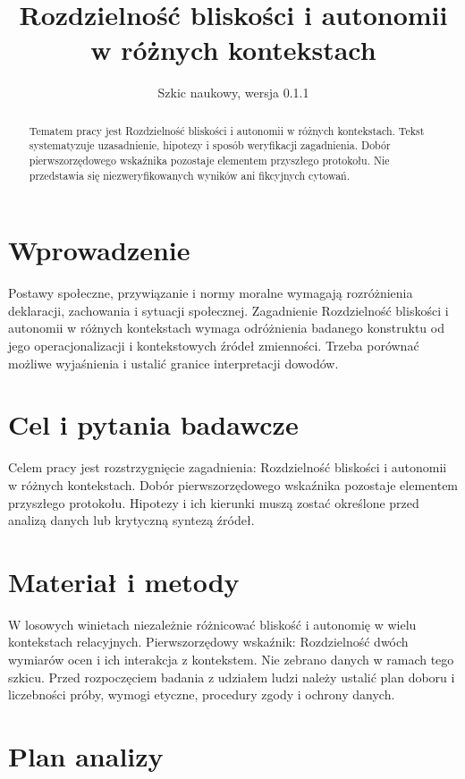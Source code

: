 \documentclass[11pt,a4paper]{article}
\title{Rozdzielność bliskości i autonomii w różnych kontekstach}
\author{}
\date{Szkic naukowy, wersja 0.1.1}
\begin{document}
\maketitle

\begin{abstract}

Tematem pracy jest Rozdzielność bliskości i autonomii w różnych kontekstach. Tekst systematyzuje uzasadnienie, hipotezy i sposób weryfikacji zagadnienia. Dobór pierwszorzędowego wskaźnika pozostaje elementem przyszłego protokołu. Nie przedstawia się niezweryfikowanych wyników ani fikcyjnych cytowań.

\end{abstract}

\section{Wprowadzenie}

Postawy społeczne, przywiązanie i normy moralne wymagają rozróżnienia deklaracji, zachowania i sytuacji społecznej. Zagadnienie Rozdzielność bliskości i autonomii w różnych kontekstach wymaga odróżnienia badanego konstruktu od jego operacjonalizacji i kontekstowych źródeł zmienności. Trzeba porównać możliwe wyjaśnienia i ustalić granice interpretacji dowodów.

\section{Cel i pytania badawcze}

Celem pracy jest rozstrzygnięcie zagadnienia: Rozdzielność bliskości i autonomii w różnych kontekstach. Dobór pierwszorzędowego wskaźnika pozostaje elementem przyszłego protokołu. Hipotezy i ich kierunki muszą zostać określone przed analizą danych lub krytyczną syntezą źródeł.

\section{Materiał i metody}

W losowych winietach niezależnie różnicować bliskość i autonomię w wielu kontekstach relacyjnych. Pierwszorzędowy wskaźnik: Rozdzielność dwóch wymiarów ocen i ich interakcja z kontekstem. Nie zebrano danych w ramach tego szkicu. Przed rozpoczęciem badania z udziałem ludzi należy ustalić plan doboru i liczebności próby, wymogi etyczne, procedury zgody i ochrony danych.

\section{Plan analizy}
\end{document}
